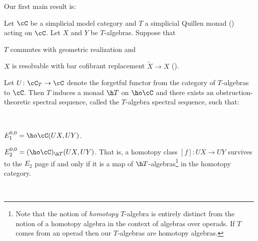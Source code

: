 \documentclass[leqno,oneside,english]{elsarticle}
\newcounter{enumisaved}
\newlength{\thmsaved}
\newlength{\thmnow}
\begin{document}
Our first main result is:
\begin{thmA}
  \begin{samepage}
    Let $\cC$ be a simplicial model category and $T$ a
    simplicial Quillen monad () acting on $\cC$.
    Let $X$ and $Y$ be $T$-algebras.  Suppose that
    \begin{hypothenumerate}
      \item $T$ commutes with geometric realization and
      \item $X$ is resolvable with bar cofibrant replacement $\widetilde{X} \to X$
      ().
    \end{hypothenumerate}
  \end{samepage}
  Let $U\colon \cC_T\rightarrow \cC$ denote the forgetful functor from
  the category of $T$-algebras to $\cC$.  Then $T$ induces a monad $\h
  T$ on $\ho\cC$ and there
  exists an obstruction-theoretic spectral sequence, called the
  $T$-algebra spectral sequence, such that:
  \begin{enumerate} \setlength{\itemsep}{.4pc}
    {
  {\ifshowcomplete
{\item[]}
\fi}
  {    {}  \ifshowcomplete
  \ 
  {
    \item $E_1^{0,0}=\ho\cC(UX,UY)$.
    \item $E_2^{0,0}=(\ho\cC)_{\h T}(UX, UY)$.  That is, a homotopy class
     $[f] \colon UX \to UY$ survives to the $E_2$ page if and only
     if it is a map of $\h T$-algebras\footnote{Note that the
     notion of \emph{homotopy} $T$-algebra is entirely distinct from
     the notion of a homotopy algebra in the context of algebras over
     operads. If $T$ comes from an operad then our $T$-algebras are
     homotopy algebras.} in the homotopy category.
    
}
  {}
  \ 
  \ifthenelse{\lengthtest{\thmnow > \thmsaved}}{
    
    \setcounter{thm}{{\strip@pt{\thmsaved}}}  
  }{
    
}}}
\end{enumerate}
\end{thmA}
\end{document}
